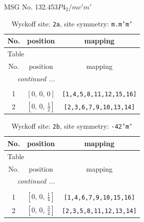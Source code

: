 \documentclass[fleqn,8pt]{jsarticle}
\begin{document}
\setcounter{MaxMatrixCols}{32}

\renewcommand{\tablename}{Table~}
\renewcommand{\figurename}{Figure~}
\begin{center}
\LARGE
MSG No. 132.453\quad$P4_{2}/mc'm'$
\end{center}
\renewcommand{\arraystretch}{1.2}
\begin{longtable}{ccc}
\caption{Wyckoff site: {\tt 2a}, site symmetry: {\tt m.m'm'}}
 \\
 \hline \hline
No. & position & mapping \\ \hline \endfirsthead

\multicolumn{2}{l}{\tablename\ \thetable{}} \\
 \hline \hline
No. & position & mapping \\ \hline \endhead

 \hline \hline
\multicolumn{2}{r}{\footnotesize\it continued ...} \\ \endfoot

 \hline \hline
\multicolumn{2}{r}{} \\ \endlastfoot

1 & $\left[ 0,\, 0,\, 0 \right]$ & {\tt [1,4,5,8,11,12,15,16]} \\ \hline
2 & $\left[ 0,\, 0,\, \frac{1}{2} \right]$ & {\tt [2,3,6,7,9,10,13,14]} \\
\end{longtable}
\renewcommand{\arraystretch}{1.2}
\begin{longtable}{ccc}
\caption{Wyckoff site: {\tt 2b}, site symmetry: {\tt -42'm'}}
 \\
 \hline \hline
No. & position & mapping \\ \hline \endfirsthead

\multicolumn{2}{l}{\tablename\ \thetable{}} \\
 \hline \hline
No. & position & mapping \\ \hline \endhead

 \hline \hline
\multicolumn{2}{r}{\footnotesize\it continued ...} \\ \endfoot

 \hline \hline
\multicolumn{2}{r}{} \\ \endlastfoot

1 & $\left[ 0,\, 0,\, \frac{1}{4} \right]$ & {\tt [1,4,6,7,9,10,15,16]} \\ \hline
2 & $\left[ 0,\, 0,\, \frac{3}{4} \right]$ & {\tt [2,3,5,8,11,12,13,14]} \\
\end{longtable}
\end{document}
